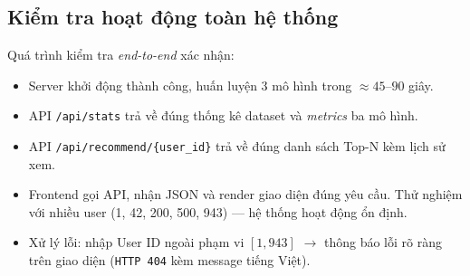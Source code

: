 \documentclass[../BTL.tex]{subfiles}
\begin{document}
\subsection{Kiểm tra hoạt động toàn hệ thống}
\label{section:3.9.3}

Quá trình kiểm tra \textit{end-to-end} xác nhận:

\begin{itemize}[itemsep=0.3em]
    \item Server khởi động thành công, huấn luyện 3 mô hình trong
    ${\approx}45$–$90$ giây.
    \item API \texttt{/api/stats} trả về đúng thống kê dataset và
    \textit{metrics} ba mô hình.
    \item API \texttt{/api/recommend/\{user\_id\}} trả về đúng danh sách
    Top-N kèm lịch sử xem.
    \item Frontend gọi API, nhận JSON và render giao diện đúng yêu cầu.
    Thử nghiệm với nhiều user (1, 42, 200, 500, 943) — hệ thống hoạt động
    ổn định.
    \item Xử lý lỗi: nhập User ID ngoài phạm vi $[1, 943]$ $\rightarrow$ thông báo lỗi
    rõ ràng trên giao diện (\texttt{HTTP 404} kèm message tiếng Việt).
\end{itemize}
\end{document}
